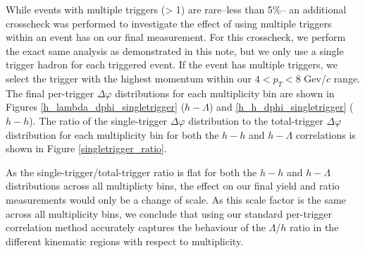 \documentclass[ALICE,manyauthors]{ALICE_analysis_notes}
\begin{document}
While events with multiple triggers (> 1) are rare--less than 5\%-- an additional crosscheck was performed to investigate the effect of using multiple triggers within an event has on our final measurement. For this crosscheck, we perform the exact same analysis as demonstrated in this note, but we only use a single trigger hadron for each triggered event. If the event has multiple triggers, we select the trigger with the highest momentum within our $4 < p_{T} < 8$ Gev/$c$ range. The final per-trigger $\Delta\varphi$ distributions for each multiplicity bin are shown in Figures \ref{h_lambda_dphi_singletrigger} ($h-\Lambda$) and \ref{h_h_dphi_singletrigger} ($h-h$). The ratio of the single-trigger $\Delta\varphi$ distribution to the total-trigger $\Delta\varphi$ distribution for each multiplicity bin for both the $h-h$ and $h-\Lambda$ correlations is shown in Figure \ref{singletrigger_ratio}.

As the single-trigger/total-trigger ratio is flat for both the $h-h$ and $h-\Lambda$ distributions across all multiplicty bins, the effect on our final yield and ratio measurements would only be a change of scale.  As this scale factor is the same across all multiplicity bins, we conclude that using our standard per-trigger correlation method accurately captures the behaviour of the $\Lambda$/$h$ ratio in the different kinematic regions with respect to multiplicity.
\end{document}
